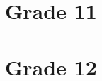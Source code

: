 \documentclass{article}
\numberwithin{equation}{section}
\begin{document}
\section{Grade 11}

\section{Grade 12}




\printbibliography[heading=bibintoc]
	
\end{document}
